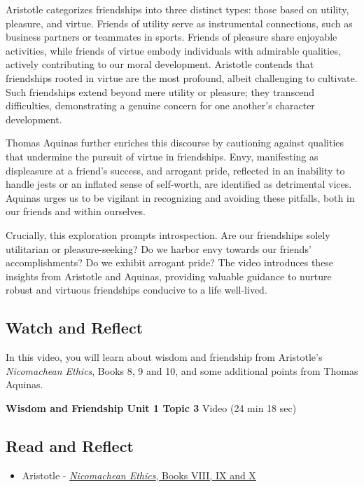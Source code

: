 \documentclass[
]{book}
\providecommand{\tightlist}{%
  \setlength{\itemsep}{0pt}\setlength{\parskip}{0pt}}
\begin{document}
Aristotle categorizes friendships into three distinct types: those based on utility, pleasure, and virtue. Friends of utility serve as instrumental connections, such as business partners or teammates in sports. Friends of pleasure share enjoyable activities, while friends of virtue embody individuals with admirable qualities, actively contributing to our moral development. Aristotle contends that friendships rooted in virtue are the most profound, albeit challenging to cultivate. Such friendships extend beyond mere utility or pleasure; they transcend difficulties, demonstrating a genuine concern for one another's character development.

Thomas Aquinas further enriches this discourse by cautioning against qualities that undermine the pursuit of virtue in friendships. Envy, manifesting as displeasure at a friend's success, and arrogant pride, reflected in an inability to handle jests or an inflated sense of self-worth, are identified as detrimental vices. Aquinas urges us to be vigilant in recognizing and avoiding these pitfalls, both in our friends and within ourselves.

Crucially, this exploration prompts introspection. Are our friendships solely utilitarian or pleasure-seeking? Do we harbor envy towards our friends' accomplishments? Do we exhibit arrogant pride? The video introduces these insights from Aristotle and Aquinas, providing valuable guidance to nurture robust and virtuous friendships conducive to a life well-lived.

\hypertarget{watch-and-reflect-4}{%
\subsection*{Watch and Reflect}\label{watch-and-reflect-4}}

In this video, you will learn about wisdom and friendship from Aristotle's \emph{Nicomachean Ethics}, Books 8, 9 and 10, and some additional points from Thomas Aquinas.

\textbf{Wisdom and Friendship Unit 1 Topic 3} Video (24 min 18 sec)

\hypertarget{read-and-reflect-2}{%
\subsection*{Read and Reflect}\label{read-and-reflect-2}}

\begin{itemize}
\tightlist
\item
  Aristotle - \href{assets/u1/PHIL-100-Aristotle-NE-VIII-IX-X.pdf}{\emph{Nicomachean Ethics}, Books VIII, IX and X}
\end{itemize}
\end{document}
